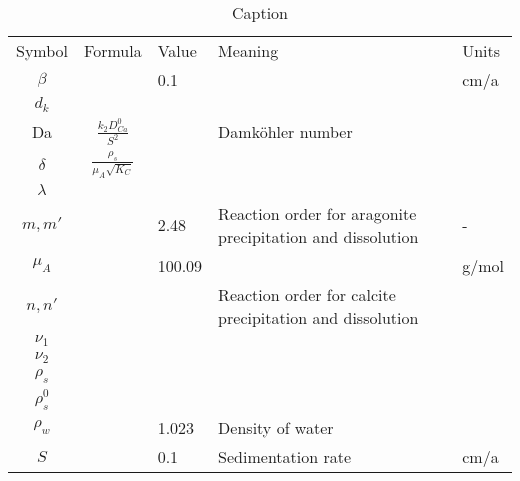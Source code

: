 \documentclass[11pt, letterpaper]{article}
\begin{document}
\begin{table}
    \centering
    \begin{tabular}{cclll}
 Symbol& Formula& Value&Meaning &Units\\
 $\beta$& & 0.1& &cm/a\\
 $d_k$& & & &\\
         Da&  $\frac{k_2D_{Ca}^0}{S^2}$& &Damköhler number &\\
 $\delta$& $\frac{\rho_s}{\mu_A\sqrt{K_C}}$& & &\\
         $\lambda$&  & & &\\
 $m, m'$& & 2.48&Reaction order for aragonite precipitation and dissolution &-\\
 $\mu_A$& & 100.09& &g/mol\\
 $n, n'$& & &Reaction order for calcite precipitation and dissolution &\\
         $\nu_1$&  & & &\\
         $\nu_2$&  & & &\\
         $\rho_s$&  & & &\\
         $\rho_s^0$& & & &\\
         $\rho_w$&  & 1.023& Density of water&\\
 $S$& & 0.1& Sedimentation rate&cm/a\\
    \end{tabular}
    \caption{Caption}
    \label{tab:my_label}
\end{table}
\end{document}
